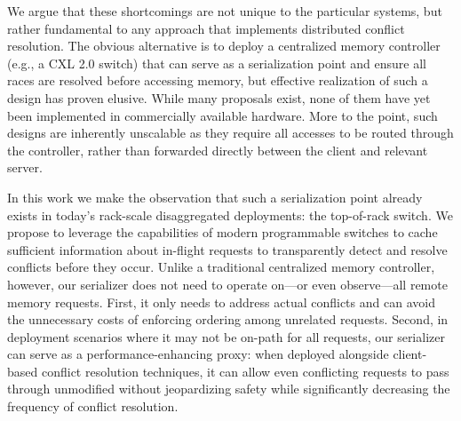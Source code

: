We argue that these shortcomings are not unique to the particular
systems, but rather fundamental to any approach that implements
distributed conflict resolution.
%
%
The obvious alternative is to deploy a centralized memory controller
(e.g., a CXL 2.0 switch) that can serve as a serialization point and
ensure all races are resolved before accessing memory, but effective
realization of such a design has proven elusive.  While many proposals
exist, none of them have yet been implemented in commercially
available hardware.  More to the point, such designs are inherently
unscalable as they require all accesses to be routed through the
controller, rather than forwarded directly between the client and
relevant server.

In this work we make the observation that such a serialization point
already exists in today's rack-scale disaggregated deployments: the
top-of-rack switch.  We propose to leverage the capabilities of modern
programmable switches to cache sufficient information about in-flight
requests to transparently detect and resolve conflicts before they
occur.  Unlike a traditional centralized memory controller, however,
our serializer does not need to operate on---or even observe---all
remote memory requests.  First, it only needs to address actual conflicts
and can avoid the unnecessary costs of enforcing ordering among
unrelated requests.  Second, in deployment scenarios where it may
not be on-path for all requests, our serializer can serve as a
performance-enhancing proxy: when deployed alongside client-based
conflict resolution techniques, it can allow even conflicting requests
to pass through unmodified without jeopardizing safety while
significantly decreasing the frequency of conflict resolution.


